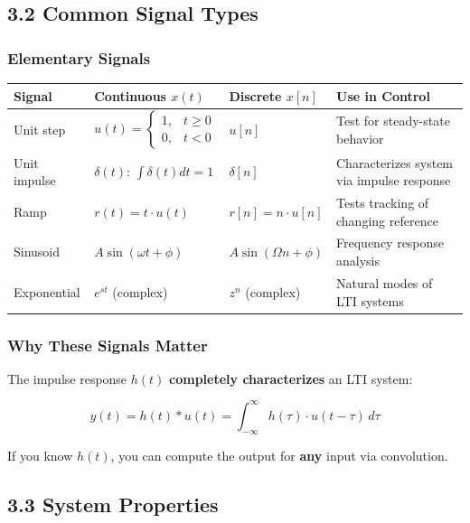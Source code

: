 \documentclass[11pt,a4paper]{book}
\begin{document}
\medskip\noindent\hrulefill\medskip

\subsection{3.2 Common Signal Types}

\subsubsection{Elementary Signals}

\begin{center}
\begin{tabular}{|l|l|l|l|}
\hline
Signal & Continuous $x(t)$ & Discrete $x[n]$ & Use in Control \\
\hline
Unit step & $u(t) = \begin{cases}1, & t \geq 0 \\ 0, & t < 0\end{cases}$ & $u[n]$ & Test for steady-state behavior \\
Unit impulse & $\delta(t)$: $\int\delta(t)dt = 1$ & $\delta[n]$ & Characterizes system via impulse response \\
Ramp & $r(t) = t \cdot u(t)$ & $r[n] = n \cdot u[n]$ & Tests tracking of changing reference \\
Sinusoid & $A\sin(\omega t + \phi)$ & $A\sin(\Omega n + \phi)$ & Frequency response analysis \\
Exponential & $e^{st}$ (complex) & $z^n$ (complex) & Natural modes of LTI systems \\
\hline
\end{tabular}
\end{center}

\subsubsection{Why These Signals Matter}

The impulse response $h(t)$ \textbf{completely characterizes} an LTI system:

\[y(t) = h(t) * u(t) = \int_{-\infty}^{\infty} h(\tau) \cdot u(t - \tau) \, d\tau\]

If you know $h(t)$, you can compute the output for \textbf{any} input via convolution.

\medskip\noindent\hrulefill\medskip

\subsection{3.3 System Properties}
\end{document}

